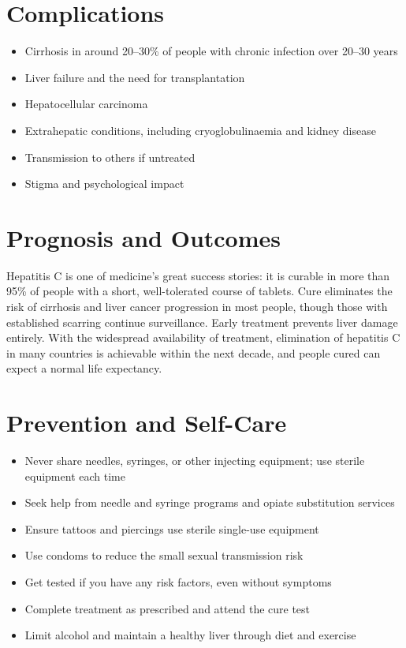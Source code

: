 \section*{Complications}
\begin{itemize}
    \item Cirrhosis in around 20--30\% of people with chronic infection over 20--30 years
    \item Liver failure and the need for transplantation
    \item Hepatocellular carcinoma
    \item Extrahepatic conditions, including cryoglobulinaemia and kidney disease
    \item Transmission to others if untreated
    \item Stigma and psychological impact
\end{itemize}

\section*{Prognosis and Outcomes}
Hepatitis C is one of medicine's great success stories: it is curable in more than 95\% of people with a short, well-tolerated course of tablets. Cure eliminates the risk of cirrhosis and liver cancer progression in most people, though those with established scarring continue surveillance. Early treatment prevents liver damage entirely. With the widespread availability of treatment, elimination of hepatitis C in many countries is achievable within the next decade, and people cured can expect a normal life expectancy.

\section*{Prevention and Self-Care}
\begin{itemize}
    \item Never share needles, syringes, or other injecting equipment; use sterile equipment each time
    \item Seek help from needle and syringe programs and opiate substitution services
    \item Ensure tattoos and piercings use sterile single-use equipment
    \item Use condoms to reduce the small sexual transmission risk
    \item Get tested if you have any risk factors, even without symptoms
    \item Complete treatment as prescribed and attend the cure test
    \item Limit alcohol and maintain a healthy liver through diet and exercise
\end{itemize}


